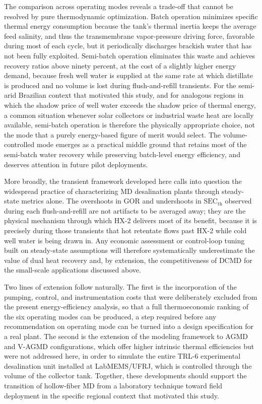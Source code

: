 \documentclass[14pt,letterpaper,fleqn]{extarticle}
\begin{document}
The comparison across operating modes reveals a trade-off that cannot be
resolved by pure thermodynamic optimization. Batch operation minimizes specific
thermal energy consumption because the tank's thermal inertia keeps the average
feed salinity, and thus the transmembrane vapor-pressure driving force,
favorable during most of each cycle, but it periodically discharges brackish
water that has not been fully exploited. Semi-batch operation eliminates this
waste and achieves recovery ratios above ninety percent, at the cost of a
slightly higher energy demand, because fresh well water is supplied at the same
rate at which distillate is produced and no volume is lost during flush-and-refill
transients. For the semi-arid Brazilian context that motivated this study, and
for analogous regions in which the shadow price of well water exceeds the shadow
price of thermal energy, a common situation whenever solar collectors or
industrial waste heat are locally available, semi-batch operation is
therefore the physically appropriate choice, not the mode that a purely
energy-based figure of merit would select. The volume-controlled mode emerges
as a practical middle ground that retains most of the semi-batch water recovery
while preserving batch-level energy efficiency, and deserves attention in future
pilot deployments.

More broadly, the transient framework developed here calls into question the
widespread practice of characterizing MD desalination plants through
steady-state metrics alone. The overshoots in $\mathrm{GOR}$ and undershoots in
$\mathrm{SEC}_{\mathrm{th}}$ observed during each flush-and-refill are not
artifacts to be averaged away; they are the physical mechanism through which
HX-2 delivers most of its benefit, because it is precisely during those
transients that hot retentate flows past HX-2 while cold well water is being
drawn in. Any economic assessment or control-loop tuning built on steady-state
assumptions will therefore systematically underestimate the value of dual heat
recovery and, by extension, the competitiveness of DCMD for the small-scale
applications discussed above.

Two lines of extension follow naturally. The first is the incorporation of the
pumping, control, and instrumentation costs that were deliberately excluded
from the present energy-efficiency analysis, so that a full thermoeconomic
ranking of the six operating modes can be produced, a step required before
any recommendation on operating mode can be turned into a design specification
for a real plant. The second is the extension of the modeling framework to AGMD
and V-AGMD configurations, which offer higher intrinsic thermal efficiencies
but were not addressed here, in order to simulate the entire TRL-6 experimental
desalination unit installed at LabMEMS/UFRJ, which is controlled through the
volume of the collector tank. Together, these developments should support the
transition of hollow-fiber MD from a laboratory technique toward field
deployment in the specific regional context that motivated this study.



\end{document}
